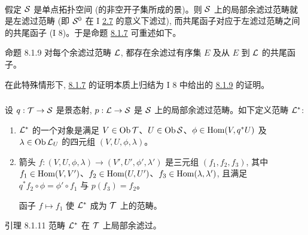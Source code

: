 \setcounter{subsubsection}{9}
\setcounter{paragraph}{-1}
\paragraph{}

假定 ${\mathcal S}$ 是单点拓扑空间 (的非空开子集所成的景)。则 ${\mathcal S}$ 上的局部余滤过范畴就是左滤过范畴 (即 ${\mathcal S}^0$ 在 I \hyperref[I.def2.7]{2.7} 的意义下滤过), 而共尾函子对应于左滤过范畴之间的共尾函子 (I 8)。于是命题 \hyperref[V.prop8.1.7]{8.1.7} 可重述如下。

\begin{enonce*}{命题 8.1.9}
对每个余滤过范畴 ${\mathcal L}$, 都存在余滤过有序集 $E$ 及从 $E$ 到 ${\mathcal L}$ 的共尾函子。
\end{enonce*}

在此特殊情形下, \hyperref[V.prop8.1.7]{8.1.7} 的证明本质上归结为 I 8 中给出的 \hyperref[V.prop8.1.9]{8.1.9} 的证明。


\subsubsection{}
设 $q:\Tt\to\Ss$ 是景态射, $p:\Ll\to\Ss$ 是 ${\mathcal S}$ 上的局部余滤过范畴。如下定义范畴 ${\mathcal L}^{\ast}$:
\begin{enumerate}
\renewcommand{\theenumi}{\roman{enumi}}
\renewcommand{\labelenumi}{\theenumi)}
\item ${\mathcal L}^{\ast}$ 的一个对象是满足 $V\in\operatorname{Ob}{\mathcal T}$、$U\in\operatorname{Ob}{\mathcal S}$、$\phi\in\operatorname{Hom}(V,q^{\ast}U)$ 及 $\lambda\in\operatorname{Ob}{\mathcal L}_U$ 的四元组 $(V,U,\phi,\lambda)$。

\item 箭头 $f:(V,U,\phi,\lambda)\to(V',U',\phi',\lambda')$ 是三元组 $(f_1,f_2,f_3)$, 其中 $f_1\in\operatorname{Hom}(V,V')$、$f_2\in\operatorname{Hom}(U,U')$、$f_3\in\operatorname{Hom}(\lambda,\lambda')$, 且满足 $q^{\ast}f_2\circ\phi=\phi'\circ f_1$ 与 $p(f_3)=f_2$。

函子 $f\mapsto f_1$ 使 ${\mathcal L}^{\ast}$ 成为 ${\mathcal T}$ 上的范畴。
\end{enumerate}

\begin{enonce*}{引理 8.1.11}
范畴 ${\mathcal L}^{\ast}$ 在 ${\mathcal T}$ 上局部余滤过。
\end{enonce*}

